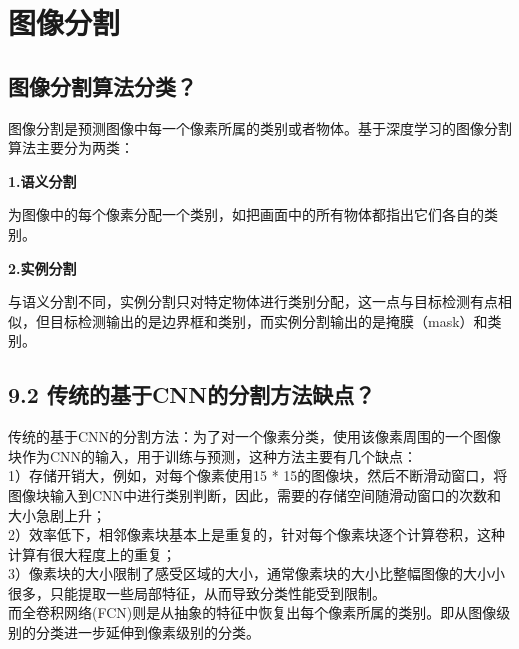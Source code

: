 \chapter{图像分割}\label{ux7b2cux4e5dux7ae0-ux56feux50cfux5206ux5272}

\section{图像分割算法分类？}\label{ux56feux50cfux5206ux5272ux7b97ux6cd5ux5206ux7c7b}

图像分割是预测图像中每一个像素所属的类别或者物体。基于深度学习的图像分割算法主要分为两类：

\textbf{1.语义分割}

为图像中的每个像素分配一个类别，如把画面中的所有物体都指出它们各自的类别。

\begin{figure}
\centering
\end{figure}

\textbf{2.实例分割}

与语义分割不同，实例分割只对特定物体进行类别分配，这一点与目标检测有点相似，但目标检测输出的是边界框和类别，而实例分割输出的是掩膜（mask）和类别。

\begin{figure}
\centering
\end{figure}

\section{9.2
传统的基于CNN的分割方法缺点？}\label{ux4f20ux7edfux7684ux57faux4e8ecnnux7684ux5206ux5272ux65b9ux6cd5ux7f3aux70b9}

传统的基于CNN的分割方法：为了对一个像素分类，使用该像素周围的一个图像块作为CNN的输入，用于训练与预测，这种方法主要有几个缺点：\\
1）存储开销大，例如，对每个像素使用15 *
15的图像块，然后不断滑动窗口，将图像块输入到CNN中进行类别判断，因此，需要的存储空间随滑动窗口的次数和大小急剧上升；\\
2）效率低下，相邻像素块基本上是重复的，针对每个像素块逐个计算卷积，这种计算有很大程度上的重复；\\
3）像素块的大小限制了感受区域的大小，通常像素块的大小比整幅图像的大小小很多，只能提取一些局部特征，从而导致分类性能受到限制。\\
而全卷积网络(FCN)则是从抽象的特征中恢复出每个像素所属的类别。即从图像级别的分类进一步延伸到像素级别的分类。

